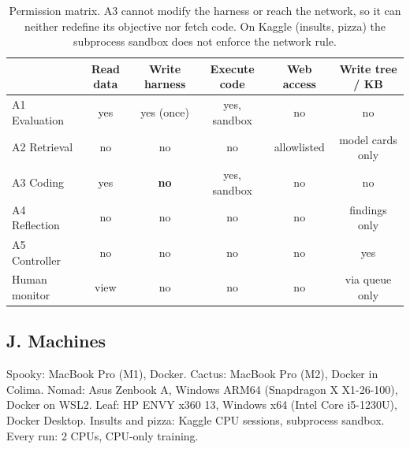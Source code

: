 \documentclass[11pt]{article}
\begin{document}
\begin{table}[H]
\centering
\small
\begin{tabular}{@{}lccccc@{}}
\toprule
& \textbf{Read data} & \textbf{Write harness} & \textbf{Execute code}
& \textbf{Web access} & \textbf{Write tree / KB} \\
\midrule
A1 Evaluation  & yes & yes (once) & yes, sandbox & no  & no \\
A2 Retrieval   & no  & no         & no           & allowlisted & model cards only \\
A3 Coding      & yes & \textbf{no}& yes, sandbox & no  & no \\
A4 Reflection  & no  & no         & no           & no  & findings only \\
A5 Controller  & no  & no         & no           & no  & yes \\
Human monitor  & view & no        & no           & no  & via queue only \\
\bottomrule
\end{tabular}
\caption{Permission matrix. A3 cannot modify the harness or reach the network, so it
can neither redefine its objective nor fetch code. On Kaggle (insults, pizza) the
subprocess sandbox does not enforce the network rule.}
\label{tab:perms}
\end{table}

\subsection*{J. Machines}

Spooky: MacBook Pro (M1), Docker. Cactus: MacBook Pro (M2), Docker in Colima. Nomad:
Asus Zenbook A, Windows ARM64 (Snapdragon X X1-26-100), Docker on WSL2. Leaf: HP ENVY
x360 13, Windows x64 (Intel Core i5-1230U), Docker Desktop. Insults and pizza: Kaggle
CPU sessions, subprocess sandbox. Every run: 2 CPUs, CPU-only training.
\end{document}
